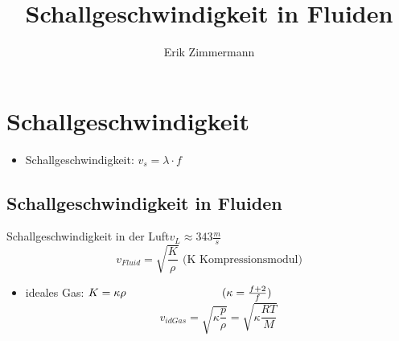 \documentclass[10pt,a4paper]{article}
\author{Erik Zimmermann}
\title{Schallgeschwindigkeit in Fluiden}
\begin{document}
\maketitle
\newpage
\section{Schallgeschwindigkeit}
\begin{itemize}
\item Schallgeschwindigkeit: $v_s= \lambda \cdot f $
\end{itemize}
\subsection{Schallgeschwindigkeit in Fluiden}
Schallgeschwindigkeit in der Luft\hspace{1,0cm}$v_{L}\approx 343 \frac{m}{s}$ 
\begin{equation}
v_{Fluid}= \sqrt{\frac{K}{\rho}} \text{	(K Kompressionsmodul)}
\end{equation}
\begin{itemize}
\item ideales Gas: $K=\kappa\rho \hspace{3,0cm}(\kappa= \frac{f+2}{f})$
\begin{equation}
v_{id Gas}=\sqrt{\kappa\frac{p}{\rho}}= \sqrt{\kappa\frac{RT}{M}}
\end{equation}
\end{itemize}
\end{document}
